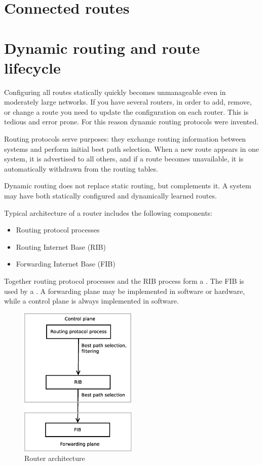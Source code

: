 \section{Connected routes}


\section{Dynamic routing and route lifecycle}

Configuring all routes statically quickly becomes unmanageable even in moderately large networks.
If you have several routers, in order to add, remove, or change a route you need to update the 
configuration on each router. This is tedious and error prone. For this reason dynamic routing
protocols were invented.

Routing protocols serve purposes: they exchange routing information between systems and
perform initial best path selection. When a new route appears in one system, it is advertised
to all others, and if a route becomes unavailable, it is automatically withdrawn from the routing tables.

Dynamic routing does not replace static routing, but complements it. A system may have both
statically configured and dynamically learned routes.

Typical architecture of a router includes the following components:

\begin{itemize}
\item Routing protocol processes
\item Routing Internet Base (RIB)
\item Forwarding Internet Base (FIB)
\end{itemize}

Together routing protocol processes and the RIB process form a .
The FIB is used by a . A forwarding plane may be implemented in software
or hardware, while a control plane is always implemented in software.

\begin{figure}[h]
    \centering
    \includegraphics[width=0.5\textwidth]{graphics/router_architecture.eps}
    \caption{Router architecture}
    \label{fig:router_architecture}
\end{figure}

